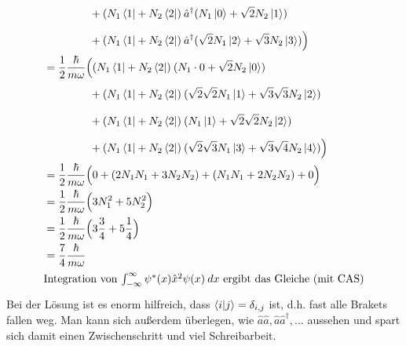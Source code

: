 \documentclass{scrartcl}
\begin{document}
\begin{enumerate}[a)]
\begin{align*}
				&\phantom{=\frac 12 \frac{\hbar}{m\omega} \Big(}
					+ (N_1 \bra 1 + N_2 \bra 2)\:\hat a^\dagger(N_1\ket 0 +\sqrt 2 N_2\ket 1) \\
				&\phantom{=\frac 12 \frac{\hbar}{m\omega} \Big(}
					+ (N_1 \bra 1 + N_2 \bra 2)\:\hat a^\dagger(\sqrt 2 N_1\ket 2 + \sqrt 3 N_2\ket 3) \Big)\\
				&=  \frac 12 \frac{\hbar}{m\omega} \Big(
					(N_1 \bra 1 + N_2 \bra 2)\:(N_1\cdot 0  + \sqrt 2 N_2\ket 0) \\
				&\phantom{=\frac 12 \frac{\hbar}{m\omega} \Big(}
					+ (N_1 \bra 1 + N_2 \bra 2)\:(\sqrt 2 \sqrt 2 N_1\ket 1 + \sqrt 3 \sqrt 3 N_2\ket 2) \\
				&\phantom{=\frac 12 \frac{\hbar}{m\omega} \Big(}
					+ (N_1 \bra 1 + N_2 \bra 2)\:(N_1\ket 1 +\sqrt 2 \sqrt 2  N_2\ket 2) \\
				&\phantom{=\frac 12 \frac{\hbar}{m\omega} \Big(}
					+ (N_1 \bra 1 + N_2 \bra 2)\:(\sqrt 2 \sqrt 3 N_1\ket 3 + \sqrt 3 \sqrt 4 N_2\ket 4) \Big) \\
				&=  \frac 12 \frac{\hbar}{m\omega} \Big( 0 + (2 N_1 N_1 + 3 N_2 N_2)  + (N_1 N_1 + 2 N_2 N_2) + 0\Big) \\
				&=  \frac 12 \frac{\hbar}{m\omega} \Big( 3 N_1^2 + 5 N_2^2\Big) \\
				&=  \frac 12 \frac{\hbar}{m\omega} \Big( 3 \frac 34 + 5 \frac 14 \Big) \\
				&=  \frac 74 \frac{\hbar}{m\omega}\\
\intertext{Integration von $\int_{-\infty}^{\infty} \psi^\ast(x) \hat x^2 \psi(x)\:dx$ ergibt das Gleiche (mit CAS)}
\end{align*}
Bei der Lösung ist es enorm hilfreich, dass $\braket{i|j} = \delta_{i,j}$ ist, d.h. fast alle Brakets fallen weg. Man kann sich außerdem überlegen, wie $\hat a \hat a, \hat a\hat a^\dagger, \dots$ aussehen und spart sich damit einen Zwischenschritt und viel Schreibarbeit.


\end{enumerate}
\end{document}
